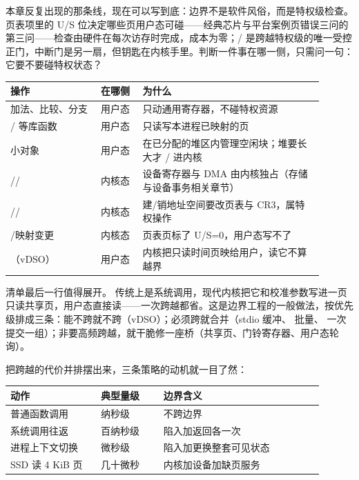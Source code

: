 本章反复出现的那条线，现在可以写到底：边界不是软件风俗，而是特权级检查。页表项里的 U/S 位决定哪些页用户态可碰——经典芯片与平台案例页错误三问的第三问——检查由硬件在每次访存时完成，成本为零；/ 是跨越特权级的唯一受控正门，中断门是另一扇，但钥匙在内核手里。判断一件事在哪一侧，只需问一句：它要不要碰特权状态？

\begin{longtable}{L{0.26\linewidth}L{0.12\linewidth}L{0.52\linewidth}}
\toprule
操作 & 在哪侧 & 为什么 \\
\midrule
加法、比较、分支 & 用户态 & 只动通用寄存器，不碰特权资源 \\\tablerowrule
{}/ 等库函数 & 用户态 & 只读写本进程已映射的页 \\\tablerowrule
{} 小对象 & 用户态 & 在已分配的堆区内管理空闲块；堆要长大才 / 进内核 \\\tablerowrule
{}// & 内核态 & 设备寄存器与 DMA 由内核独占（存储与设备事务相关章节） \\\tablerowrule
{}// & 内核态 & 建/销地址空间要改页表与 CR3，属特权操作 \\\tablerowrule
{}/映射变更 & 内核态 & 页表页标了 U/S=0，用户态写不了 \\\tablerowrule
{}（vDSO） & 用户态 & 内核把只读时间页映给用户，读它不算越界 \\
\bottomrule
\end{longtable}

清单最后一行值得展开。 传统上是系统调用，现代内核把它和校准参数写进一页只读共享页，用户态直接读——一次跨越都省。这是边界工程的一般做法，按优先级排成三条：能不跨就不跨（vDSO）；必须跨就合并（stdio 缓冲、 批量、 一次提交一组）；非要高频跨越，就干脆修一座桥（共享页、门铃寄存器、用户态轮询）。

把跨越的代价并排摆出来，三条策略的动机就一目了然：

\begin{longtable}{L{0.26\linewidth}L{0.18\linewidth}L{0.46\linewidth}}
\toprule
动作 & 典型量级 & 边界含义 \\
\midrule
普通函数调用 & 纳秒级 & 不跨边界 \\\tablerowrule
系统调用往返 & 百纳秒级 & 陷入加返回各一次 \\\tablerowrule
进程上下文切换 & 微秒级 & 陷入加更换整套可见状态 \\\tablerowrule
SSD 读 4 KiB 页 & 几十微秒 & 内核加设备加缺页服务 \\
\bottomrule
\end{longtable}


